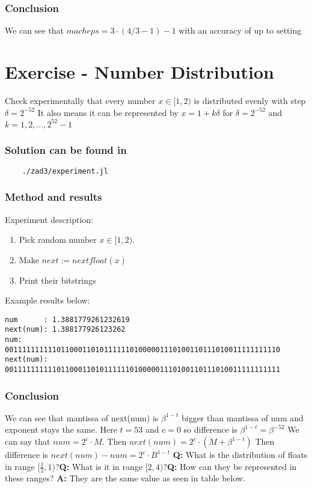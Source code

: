 \documentclass[12pt]{article}
\begin{document}
\subsubsection*{Conclusion}
We can see that $macheps = 3\cdot(4/3-1)-1$ with an accuracy of up to setting
\section{Exercise - Number Distribution}
Check experimentally that every number $ x \in [1, 2) $ is distributed evenly with step $\delta = 2^{-52}$
It also means it can be represented by $ x = 1 + k\delta $ for $\delta = 2^{-52}$ and $k=1,2,...,2^{52}-1$
\subsubsection*{Solution can be found in}
\begin{verbatim}
    ./zad3/experiment.jl
\end{verbatim}
\subsubsection*{Method and results}
Experiment description: 
\begin{enumerate}
\item Pick random number $x \in [1,2)$. 
\item Make $next := nextfloat(x)$ 
\item Print their bitstrings
\end{enumerate}
Example results below:
\begin{verbatim}
num      : 1.3881779261232619
next(num): 1.388177926123262
num:       0011111111110110001101011111101000001110100110111010011111111110
next(num): 0011111111110110001101011111101000001110100110111010011111111111
\end{verbatim}
\subsubsection*{Conclusion}
We can see that mantissa of next(num) is $\beta^{1-t}$ bigger than mantissa of num and
exponent stays the same. Here $t = 53$ and $c = 0$ so difference is $\beta^{1-t} = \beta^{-52}$ \newline
We can say that $num = 2^{c} \cdot M$. Then $next(num) = 2^c \cdot (M + \beta^{1-t})$ \newline
Then difference is $next(num) - num = 2^c \cdot B^{1-t}$ \newline
\textbf{Q:} What is the distribution of floats in range $[\frac{1}{2}, 1)$?\newline\textbf{Q:} What is it in range $[2, 4)$?\newline\textbf{Q:}  How can they be represented in these ranges? \newline
\textbf{A:} They are the same value as seen in table below. \newline
\end{document}
